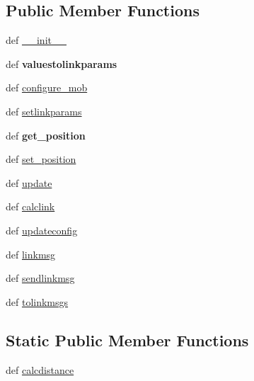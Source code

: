 \subsection*{Public Member Functions}
\begin{DoxyCompactItemize}
\item 
def \hyperlink{classcore_1_1mobility_1_1_basic_range_model_a1b1a787ee56aeb4bb88996414e7d1022}{\+\_\+\+\_\+init\+\_\+\+\_\+}
\item 
\hypertarget{classcore_1_1mobility_1_1_basic_range_model_a80a50bece02da40abab69f1323697533}{def {\bfseries valuestolinkparams}}\label{classcore_1_1mobility_1_1_basic_range_model_a80a50bece02da40abab69f1323697533}

\item 
def \hyperlink{classcore_1_1mobility_1_1_basic_range_model_a47b1c565e5129fa98c288b4f8da887d7}{configure\+\_\+mob}
\item 
def \hyperlink{classcore_1_1mobility_1_1_basic_range_model_a7314252be7cef302ee6530a7e0759877}{setlinkparams}
\item 
\hypertarget{classcore_1_1mobility_1_1_basic_range_model_ae30a19d78b85b789050aee5152f7ae9e}{def {\bfseries get\+\_\+position}}\label{classcore_1_1mobility_1_1_basic_range_model_ae30a19d78b85b789050aee5152f7ae9e}

\item 
def \hyperlink{classcore_1_1mobility_1_1_basic_range_model_a8acc368e80977e4113473a91e4250524}{set\+\_\+position}
\item 
def \hyperlink{classcore_1_1mobility_1_1_basic_range_model_a1baebfc2ad0ebeb80cf3eb6b900e7d06}{update}
\item 
def \hyperlink{classcore_1_1mobility_1_1_basic_range_model_af5cb10ba600ceb6ed5828467f6219816}{calclink}
\item 
def \hyperlink{classcore_1_1mobility_1_1_basic_range_model_aef00a74c3391c0ff0639257328af3704}{updateconfig}
\item 
def \hyperlink{classcore_1_1mobility_1_1_basic_range_model_a40226f20b33f9a177e6d7ddbf4e1d02c}{linkmsg}
\item 
def \hyperlink{classcore_1_1mobility_1_1_basic_range_model_a1f632b74550bfc45684b63b9f1e74949}{sendlinkmsg}
\item 
def \hyperlink{classcore_1_1mobility_1_1_basic_range_model_a3f171e49d58eb03506ee54ce93e62b20}{tolinkmsgs}
\end{DoxyCompactItemize}
\subsection*{Static Public Member Functions}
\begin{DoxyCompactItemize}
\item 
def \hyperlink{classcore_1_1mobility_1_1_basic_range_model_aa8f655e22f439fafbfaf943536a39ba7}{calcdistance}
\end{DoxyCompactItemize}
